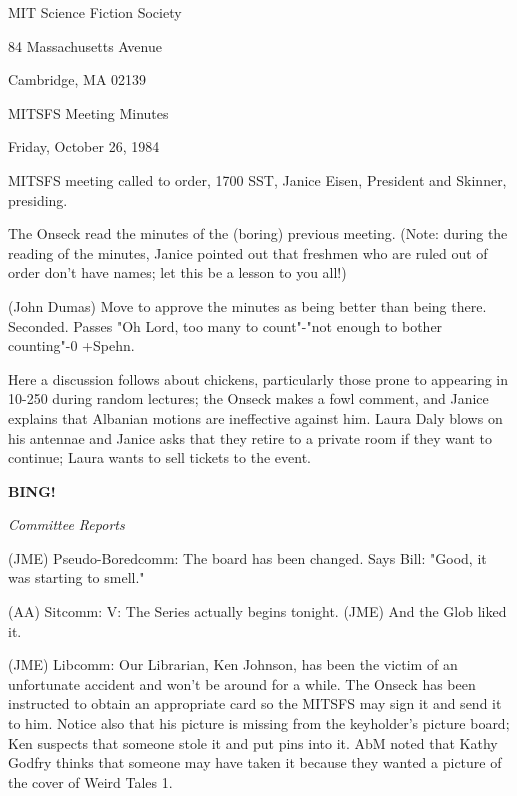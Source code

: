 \documentclass[12pt]{article}
\newcommand{\bing}{{\bf BING!} }
\newcommand{\goto}[1]{\bing \vskip 12pt \centerline{{\em{#1}}}}
\begin{document}
\begin{center}

MIT Science Fiction Society 

84 Massachusetts Avenue

Cambridge, MA 02139

\vspace{12pt}

MITSFS Meeting Minutes 

Friday, October 26, 1984

\end{center}
 
\vspace{18pt}

\setlength{\parskip}{6pt}

\noindent
MITSFS meeting called to order, 1700 SST,
Janice Eisen, President and Skinner, presiding.

The Onseck read the minutes of the (boring) previous meeting. (Note: during the reading of the minutes, Janice pointed out that freshmen who are ruled out of order don't have names; let this be a lesson to you all!)

(John Dumas) Move to approve the minutes as being better than being there. Seconded. Passes "Oh Lord, too many to count"-"not enough to bother counting"-0 +Spehn.

Here a discussion follows about chickens, particularly those prone to appearing in 10-250 during random lectures; the Onseck makes a fowl comment, and Janice explains that Albanian motions are ineffective against him. Laura Daly blows on his antennae and Janice asks that they retire to a private room if they want to continue; Laura wants to sell tickets to the event.

\goto{Committee Reports}

(JME) Pseudo-Boredcomm: The board has been changed. Says Bill: "Good, it was starting to smell."

(AA) Sitcomm: V: The Series actually begins tonight. (JME) And the Glob liked it.

(JME) Libcomm: Our Librarian, Ken Johnson, has been the victim of an unfortunate accident and won't be around for a while. The Onseck has been instructed to obtain an appropriate card so the MITSFS may sign it and send it to him. Notice also that his picture is missing from the keyholder's picture board; Ken suspects that someone stole it and put pins into it. AbM noted that Kathy Godfry thinks that someone may have taken it because they wanted a picture of the cover of Weird Tales 1.
\end{document}
